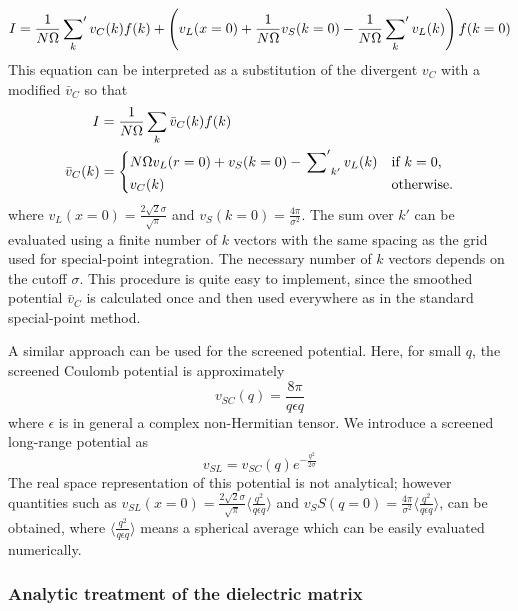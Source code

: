 \documentclass[11pt]{article}
\begin{document}
\begin{equation}
I = \frac{1}{N\Omega}
   \sideset{}{'}\sum_{k} v_C(k)f(k) +
   \left(v_L(x=0) + \frac{1}{N\Omega}v_S(k=0) -
    \frac{1}{N\Omega}\sideset{}{'}\sum_{k} v_L(k)
   \right)f(k=0)
\end{equation}
This equation can be interpreted as a substitution of the divergent
$v_C$ with a modified $\bar{v}_C$ so that
\begin{align}
I &= \frac{1}{N\Omega} \sum_{k} \bar{v}_C(k) f(k) \\
\bar{v}_C(k) &= \begin{cases}
   N\Omega v_L(r=0) + v_S(k=0) -
    \sideset{}{'}\sum_{k'} v_L(k)
 & \text{if $k=0$,} \\
  v_C(k) & \text{otherwise}.
  \end{cases}
\end{align}
where $v_L(x=0) = \frac{2\sqrt{2}\sigma}{\sqrt{\pi}}$ and $v_S(k=0) = \frac{4\pi}{\sigma^2}$.
The sum over $k'$ can be evaluated using a finite number
of $k$ vectors with the same spacing as the grid used for special-point integration.
The necessary number of $k$ vectors depends on the cutoff $\sigma$.
This procedure is quite easy to implement, since the smoothed
potential $\bar{v}_C$ is calculated once and then
used everywhere as in the standard special-point method.

A similar approach can be used for the screened potential.
Here, for small $q$, the screened Coulomb potential is approximately
\begin{equation}
v_{SC}(q) = \frac{8\pi}{q\epsilon q}
\end{equation}
where $\epsilon$ is in general a complex non-Hermitian tensor.
We introduce a screened long-range potential as
\begin{equation}
v_{SL}=v_{SC}(q)e^{-\frac{q^2}{2\sigma}}
\end{equation}
The real space representation of this potential is not analytical;
however quantities such as
$v_{SL}(x=0) = \frac{2\sqrt{2}\sigma}{\sqrt{\pi}}
\langle \frac{q^2}{q\epsilon q} \rangle$
and
$v_SS(q=0) = \frac{4\pi}{\sigma^2}
\langle \frac{q^2}{q\epsilon q} \rangle$, can be obtained, where $\langle \frac{q^2}{q\epsilon q} \rangle$ means 
a spherical average which can be easily evaluated numerically.

\subsubsection{Analytic treatment of the dielectric matrix}
\end{document}
